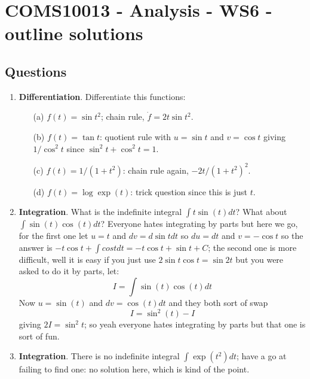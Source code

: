 \documentclass[11pt,a4paper]{scrartcl}
\begin{document}
\section*{COMS10013 - Analysis - WS6 - outline solutions}

\subsection*{Questions}


\begin{enumerate}

\item \textbf{Differentiation}. Differentiate this functions:
	\begin{itemize}
		\item[(a)] $f(t)=\sin{t^2}$; chain rule, $\dot{f}=2t\sin{t^2}$.
		\item[(b)] $f(t)=\tan{t}$: quotient rule with $u=\sin{t}$ and $v=\cos{t}$ giving $1/\cos^2{t}$ since $\sin^2{t}+\cos^2{t}=1$.
		\item[(c)] $f(t)=1/(1+t^2)$: chain rule again, $-2t/(1+t^2)^2$.
		\item[(d)] $f(t)=\log{\exp{(t)}}$: trick question since this is just $t$.
	\end{itemize}

      \item \textbf{Integration}. What is the indefinite integral $\int t\sin{(t)}dt$? What about $\int \sin{(t)}\cos{(t)}dt$? Everyone hates integrating by parts but here we go, for the first one let $u=t$ and $dv=d\sin{t}dt$ so $du=dt$ and $v=-\cos{t}$ so the answer is $-t\cos{t}+\int cos{t}dt = -t\cos{t}+\sin{t}+C$; the second one is more difficult, well it is easy if you just use $2\sin{t}\cos{t}=\sin{2t}$ but you were asked to do it by parts, let:
        \begin{equation}
          I=\int \sin{(t)}\cos{(t)}dt
        \end{equation}
        Now $u=\sin{(t)}$ and $dv=\cos{(t)dt}$ and they both sort of swap
        \begin{equation}
          I=\sin^2{(t)}-I
        \end{equation}
        giving $2I=\sin^2{t}$; so yeah everyone hates integrating by parts but that one is sort of fun.
       

      \item \textbf{Integration}. There is no indefinite integral
        $\int \exp{(t^2)}dt$; have a go at failing to find one: no
        solution here, which is kind of the point.


\end{enumerate}
\end{document}
